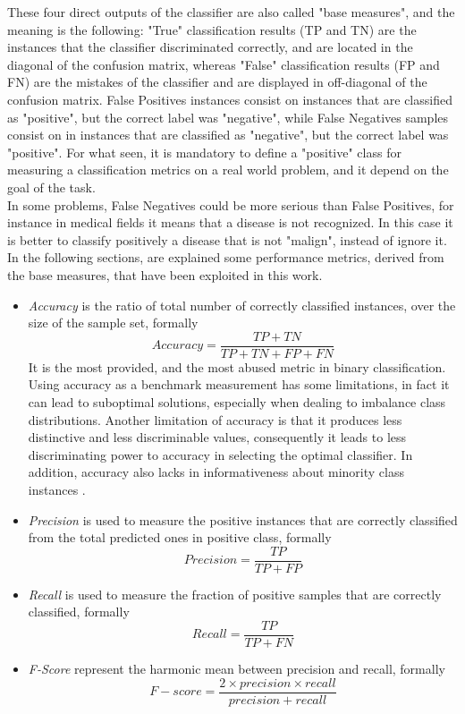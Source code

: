 These four direct outputs of the classifier are also called "base measures", and the meaning is the following: "True" classification results (\ac{TP} and \ac{TN}) are the instances that the classifier discriminated correctly, and are located in the diagonal of the confusion matrix, whereas "False" classification results (\ac{FP} and \ac{FN}) are the mistakes of the classifier and are displayed in off-diagonal of the confusion matrix. False Positives instances consist on instances that are classified as "positive", but the correct label was "negative", while False Negatives samples consist on in instances that are classified as "negative", but the correct label was "positive". For what seen, it is mandatory to define a "positive" class for measuring a classification metrics on a real world problem, and it depend on the goal of the task.\\
In some problems, False Negatives could be more serious than False Positives, for instance in medical fields it means that a disease is not recognized. In this case it is better to classify positively a disease that is not "malign", instead of ignore it. \\
In the following sections, are explained some performance metrics, derived from the base measures, that have been exploited in this work.

\begin{itemize}
	\item \textit{Accuracy} is the ratio of total number of correctly classified instances, over the size of the sample set, formally
	\[ Accuracy = \frac{TP + TN}{TP + TN + FP + FN} \]
	It is the most provided, and the most abused metric in binary classification. Using accuracy as a benchmark measurement has some limitations, in fact it can lead to suboptimal solutions, especially when dealing to imbalance class distributions. Another limitation of accuracy is that it produces less distinctive and less discriminable values, consequently it leads to less discriminating power to accuracy in selecting the optimal classifier. In addition, accuracy also lacks in informativeness about minority class instances \cite{article-ev-metrics}.
	
	\item \textit{Precision} is used to measure the positive instances that are correctly classified from the total predicted ones in positive class, formally
	\[ Precision = \frac{TP}{TP + FP} \]
	
	\item \textit{Recall} is used to measure the fraction of positive samples that are correctly classified, formally
	\[ Recall = \frac{TP}{TP + FN} \]
	
	\item \textit{F-Score} represent the harmonic mean between precision and recall, formally
	\[ F-score = \frac{2 \times precision \times recall}{precision + recall} \]
\end{itemize}

